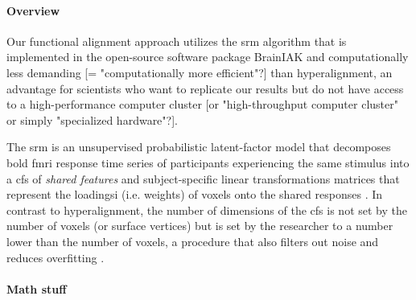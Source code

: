 \paragraph{Overview}

Our functional alignment approach utilizes the \ac{srm} algorithm
\citep{chen2015reduced, richard2019fast} that is implemented in the open-source
software package BrainIAK \citep[Brain Imaging Analysis Kit;
\href{https://brainiak.org}{\url{brainiak.org}}][]{kumar2020brainiak,
kumar2020brainiaktutorial} and computationally less demanding [=
"computationally more efficient"?] than hyperalignment, an advantage for
scientists who want to replicate our results but do not have access to a
high-performance computer cluster [or "high-throughput computer cluster" or
simply "specialized hardware"?].

The \ac{srm} is an unsupervised probabilistic latent-factor model that
decomposes \ac{bold} \ac{fmri} response time series of participants experiencing
the same stimulus into a \ac{cfs} of \textit{shared features} \citep[also called
``\textit{shared feature space}'';][]{chen2015reduced} and subject-specific
linear transformations matrices that represent the loadingsi (i.e. weights) of
voxels onto the shared responses \citep{kumar2020brainiak,
cohen2017computational}.
In contrast to hyperalignment, the number of dimensions of the \ac{cfs} is not
set by the number of voxels (or surface vertices) but is set by the researcher
to a number lower than the number of voxels, a procedure that also filters out
noise and reduces overfitting \citep{chen2015reduced}.


\paragraph{Math stuff}


